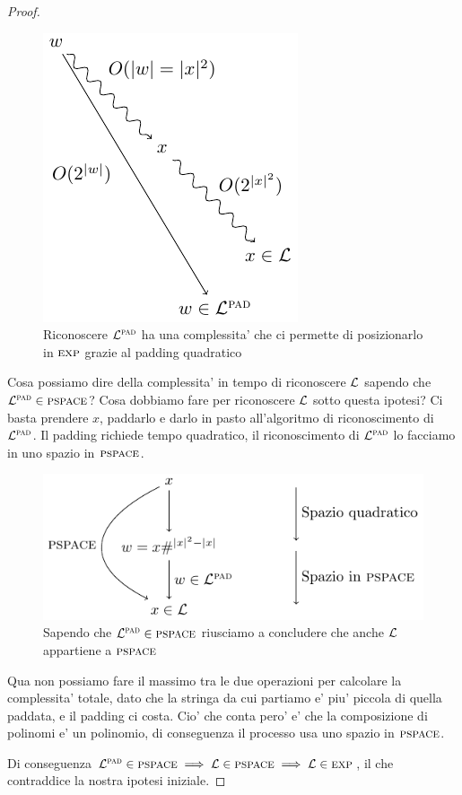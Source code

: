 \begin{proof}
    \begin{figure}[h]
        \begin{center}
            \includegraphics{./img/timespacehierarchies/PaddingCheat.pdf}
            \caption{Riconoscere $\mathcal{L}^{\textsc{pad}}$ ha una complessita' che ci permette di posizionarlo in
            $\textsc{exp}$ grazie al padding quadratico}
        \end{center}
    \end{figure}

    Cosa possiamo dire della complessita' in tempo di riconoscere $\mathcal{L}$ sapendo che $\mathcal{L}^{\textsc{pad}} \in
    \textsc{pspace}$? Cosa dobbiamo fare per riconoscere $\mathcal{L}$ sotto questa ipotesi? Ci basta prendere
    $x$, paddarlo e darlo in pasto all'algoritmo di riconoscimento di $\mathcal{L}^{\textsc{pad}}$. Il padding richiede
    tempo quadratico, il riconoscimento di $\mathcal{L}^{\textsc{pad}}$ lo facciamo in uno spazio in $\textsc{pspace}$.

    \begin{figure}[h]
        \begin{center}
            \includegraphics{./img/timespacehierarchies/LPadComplexity.pdf}
            \caption{Sapendo che $\mathcal{L}^{\textsc{pad}} \in \textsc{pspace}$ riusciamo a concludere che anche $\mathcal{L}$
            appartiene a $\textsc{pspace}$}
        \end{center}
    \end{figure}

    Qua non possiamo fare il massimo tra le due operazioni per calcolare la complessita' totale,
    dato che la stringa da cui partiamo e' piu' piccola di quella paddata, e il padding ci costa.
    Cio' che conta pero' e' che la composizione di polinomi e' un polinomio, di conseguenza il
    processo usa uno spazio in $\textsc{pspace}$.

    Di conseguenza $\mathcal{L}^{\textsc{pad}} \in \textsc{pspace} \implies \mathcal{L} \in \textsc{pspace} \implies \mathcal{L} \in \textsc{exp}$, il che
    contraddice la nostra ipotesi iniziale.
\end{proof}

